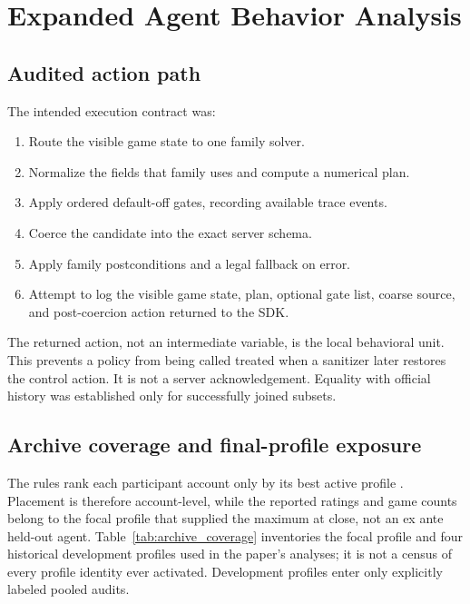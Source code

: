 \section{Expanded Agent Behavior Analysis}
\label{app:behavior}

\subsection{Audited action path}

The intended execution contract was:
\begin{enumerate}
  \item Route the visible game state to one family solver.
  \item Normalize the fields that family uses and compute a numerical plan.
  \item Apply ordered default-off gates, recording available trace events.
  \item Coerce the candidate into the exact server schema.
  \item Apply family postconditions and a legal fallback on error.
  \item Attempt to log the visible game state, plan, optional gate list, coarse source, and
  post-coercion action returned to the SDK.
\end{enumerate}
The returned action, not an intermediate variable, is the local behavioral
unit. This
prevents a policy from being called treated when a sanitizer later restores the
control action. It is not a server acknowledgement. Equality with official
history was established only for successfully joined subsets.

\subsection{Archive coverage and final-profile exposure}

The rules rank each participant account only by its best active profile
\citep{gleecompetition2026}. Placement is therefore account-level, while the
reported ratings and game counts belong to the focal profile that supplied the
maximum at close, not an ex ante held-out agent. Table~\ref{tab:archive_coverage}
inventories the focal profile and four historical development profiles used in
the paper's analyses; it is not a census of every profile identity ever
activated. Development profiles enter only explicitly labeled pooled audits.

